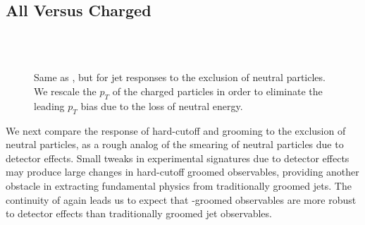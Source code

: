 \documentclass[letterpaper,11pt]{article}
\begin{document}
\subsection{All Versus Charged}
\label{sec:all_v_charged}
\begin{figure}[p]
\\
\\
\caption{
    Same as , but for jet responses to the exclusion of neutral particles.
    We rescale the \(p_T\) of the charged particles in order to eliminate the leading $p_T$ bias due to the loss of neutral energy.
}
\centering
\label{fig:avc_response}
\end{figure}

We next compare the response of hard-cutoff and \PIRANHA{} grooming to the exclusion of neutral particles, as a rough analog of the smearing of neutral particles due to detector effects.
%
Small tweaks in experimental signatures due to detector effects may produce large changes in hard-cutoff groomed observables, providing another obstacle in extracting fundamental physics from traditionally groomed jets.
%
The continuity of \PIRANHA{} again leads us to expect that \PIRANHA{}-groomed observables are more robust to detector effects than traditionally groomed jet observables.
\end{document}
